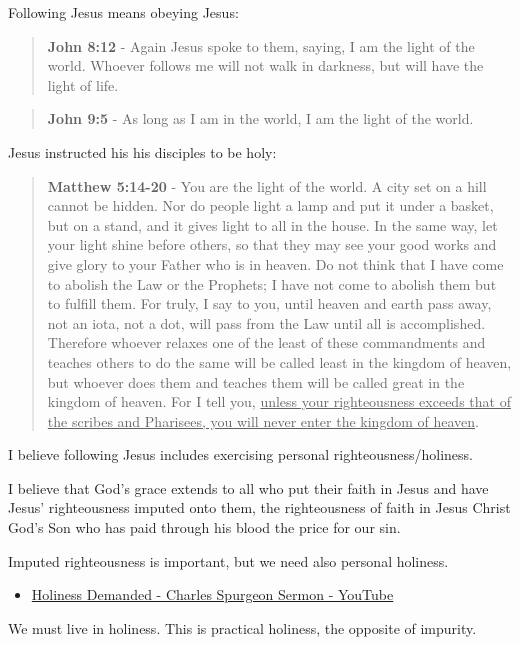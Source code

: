 \documentclass[11pt]{article}
\begin{document}
Following Jesus means obeying Jesus:

\begin{quote}
\textbf{John 8:12} - Again Jesus spoke to them, saying, I am the light of the world. Whoever follows me will not walk in darkness, but will have the light of life.
\end{quote}

\begin{quote}
\textbf{John 9:5} - As long as I am in the world, I am the light of the world.
\end{quote}

Jesus instructed his his disciples to be holy:

\begin{quote}
\textbf{Matthew 5:14-20} - You are the light of the world. A city set on a hill cannot be hidden. Nor do people light a lamp and put it under a basket, but on a stand, and it gives light to all in the house. In the same way, let your light shine before others, so that they may see your good works and give glory to your Father who is in heaven. Do not think that I have come to abolish the Law or the Prophets; I have not come to abolish them but to fulfill them. For truly, I say to you, until heaven and earth pass away, not an iota, not a dot, will pass from the Law until all is accomplished. Therefore whoever relaxes one of the least of these commandments and teaches others to do the same will be called least in the kingdom of heaven, but whoever does them and teaches them will be called great in the kingdom of heaven. For I tell you, \uline{unless your righteousness exceeds that of the scribes and Pharisees, you will never enter the kingdom of heaven}.
\end{quote}

I believe following Jesus includes exercising personal righteousness/holiness.

I believe that God's grace extends to all who
put their faith in Jesus and have Jesus'
righteousness imputed onto them, the
righteousness of faith in Jesus Christ God's
Son who has paid through his blood the price
for our sin.

Imputed righteousness is important, but we need also personal holiness.
\begin{itemize}
\item \href{https://www.youtube.com/watch?v=S8rmiZRzqfg}{Holiness Demanded - Charles Spurgeon Sermon - YouTube}
\end{itemize}

We must live in holiness. This is practical holiness, the opposite of impurity.
\end{document}
